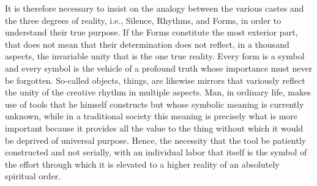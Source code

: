 It is therefore necessary to insist on the analogy between the various castes and the three degrees of reality, i.e., Silence, Rhythms, and Forms, in order to understand their true purpose. If the Forms constitute the most exterior part, that does not mean that their determination does not reflect, in a thousand aspects, the invariable unity that is the one true reality. Every form is a symbol and every symbol is the vehicle of a profound truth whose importance must never be forgotten. So-called objects, things, are likewise mirrors that variously reflect the unity of the creative rhythm in multiple aspects. Man, in ordinary life, makes use of tools that he himself constructs but whose symbolic meaning is currently unknown, while in a traditional society this meaning is precisely what is more important because it provides all the value to the thing without which it would be deprived of universal purpose. Hence, the necessity that the tool be patiently constructed and not serially, with an individual labor that itself is the symbol of the effort through which it is elevated to a higher reality of an absolutely spiritual order.

